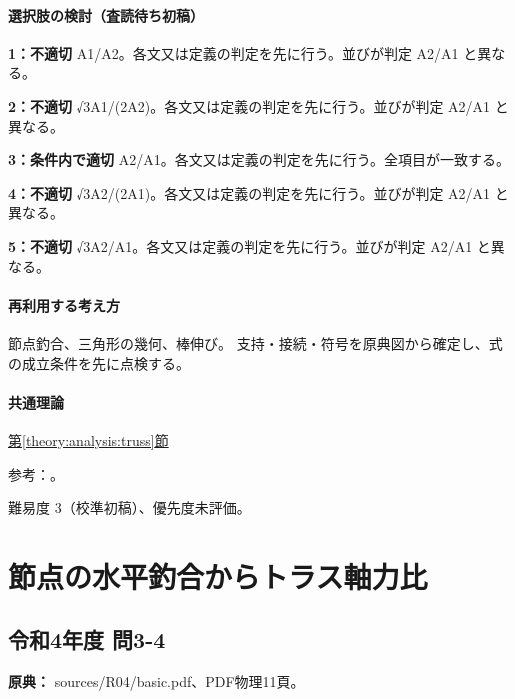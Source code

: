 \paragraph{選択肢の検討（査読待ち初稿）}\mbox{}\par

\noindent\textbf{1：不適切} A1/A2。各文又は定義の判定を先に行う。並びが判定 A2/A1 と異なる。\par

\noindent\textbf{2：不適切} √3A1/(2A2)。各文又は定義の判定を先に行う。並びが判定 A2/A1 と異なる。\par

\noindent\textbf{3：条件内で適切} A2/A1。各文又は定義の判定を先に行う。全項目が一致する。\par

\noindent\textbf{4：不適切} √3A2/(2A1)。各文又は定義の判定を先に行う。並びが判定 A2/A1 と異なる。\par

\noindent\textbf{5：不適切} √3A2/A1。各文又は定義の判定を先に行う。並びが判定 A2/A1 と異なる。\par

\paragraph{再利用する考え方} 節点釣合、三角形の幾何、棒伸び。 支持・接続・符号を原典図から確定し、式の成立条件を先に点検する。

\paragraph{共通理論} \hyperref[theory:analysis:truss]{第\ref*{theory:analysis:truss}節}

\par 参考：\cite{mit_material_elastic2000}。

\par 難易度 3（校準初稿）、優先度未評価。

\section{節点の水平釣合からトラス軸力比}

\subsection{令和4年度 問3-4}
\label{q:r04-reg-basic-3-4}

\noindent\textbf{原典：} sources/R04/basic.pdf、PDF物理11頁。

